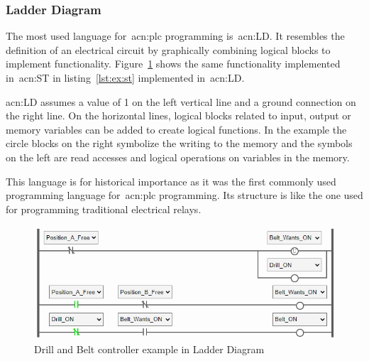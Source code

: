 \subsubsection{Ladder Diagram}

The most used language for~\acrshort{acn:plc} programming is~\acrfull{acn:LD}.
It resembles the definition of an electrical circuit by graphically combining logical blocks to implement functionality.
Figure~\ref{fig:drill:ld} shows the same functionality implemented in~\acrshort{acn:ST} in listing~\ref{lst:ex:st} implemented in~\acrshort{acn:LD}.

\acrshort{acn:LD} assumes a value of 1 on the left vertical line and a ground connection on the right line.
On the horizontal lines, logical blocks related to input, output or memory variables can be added to create logical functions.
In the example the circle blocks on the right symbolize the writing to the memory and the symbols on the left are read accesses and logical operations on variables in the memory.

This language is for historical importance as it was the first commonly used programming language for~\acrshort{acn:plc} programming.
Its structure is like the one used for programming traditional electrical relays.

\begin{figure}[h]
	\includegraphics[width=\textwidth]{Figures/belt_drill_ld.png}
	\caption[Drill and Belt controller example in Ladder Diagram]{Drill and Belt controller example in Ladder Diagram}
	\label{fig:drill:ld}
\end{figure}